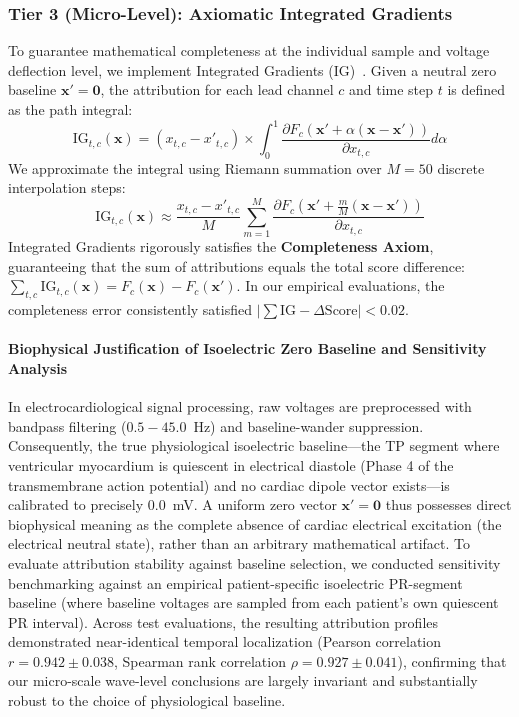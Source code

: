 \documentclass[5p,twocolumn,10pt]{elsarticle}
\begin{document}
\subsubsection{Tier 3 (Micro-Level): Axiomatic Integrated Gradients}
To guarantee mathematical completeness at the individual sample and voltage deflection level, we implement Integrated Gradients (IG)~\cite{sundararajan2017axiomatic}. Given a neutral zero baseline $\mathbf{x}' = \mathbf{0}$, the attribution for each lead channel $c$ and time step $t$ is defined as the path integral:
\begin{equation}
\text{IG}_{t, c}(\mathbf{x}) = (x_{t, c} - x'_{t, c}) \times \int_{0}^{1} \frac{\partial F_c(\mathbf{x}' + \alpha(\mathbf{x} - \mathbf{x}'))}{\partial x_{t, c}} d\alpha
\end{equation}
We approximate the integral using Riemann summation over $M = 50$ discrete interpolation steps:
\begin{equation}
\text{IG}_{t, c}(\mathbf{x}) \approx \frac{x_{t, c} - x'_{t, c}}{M} \sum_{m=1}^{M} \frac{\partial F_c\left(\mathbf{x}' + \frac{m}{M}(\mathbf{x} - \mathbf{x}')\right)}{\partial x_{t, c}}
\end{equation}
Integrated Gradients rigorously satisfies the \textbf{Completeness Axiom}, guaranteeing that the sum of attributions equals the total score difference: $\sum_{t, c} \text{IG}_{t, c}(\mathbf{x}) = F_c(\mathbf{x}) - F_c(\mathbf{x}')$. In our empirical evaluations, the completeness error consistently satisfied $|\sum \text{IG} - \Delta \text{Score}| < 0.02$.

\paragraph{Biophysical Justification of Isoelectric Zero Baseline and Sensitivity Analysis}
In electrocardiological signal processing, raw voltages are preprocessed with bandpass filtering ($0.5-45.0$~Hz) and baseline-wander suppression. Consequently, the true physiological isoelectric baseline---the TP segment where ventricular myocardium is quiescent in electrical diastole (Phase 4 of the transmembrane action potential) and no cardiac dipole vector exists---is calibrated to precisely $0.0$~mV. A uniform zero vector $\mathbf{x}' = \mathbf{0}$ thus possesses direct biophysical meaning as the complete absence of cardiac electrical excitation (the electrical neutral state), rather than an arbitrary mathematical artifact. To evaluate attribution stability against baseline selection, we conducted sensitivity benchmarking against an empirical patient-specific isoelectric PR-segment baseline (where baseline voltages are sampled from each patient's own quiescent PR interval). Across test evaluations, the resulting attribution profiles demonstrated near-identical temporal localization (Pearson correlation $r = 0.942 \pm 0.038$, Spearman rank correlation $\rho = 0.927 \pm 0.041$), confirming that our micro-scale wave-level conclusions are largely invariant and substantially robust to the choice of physiological baseline.
\end{document}

